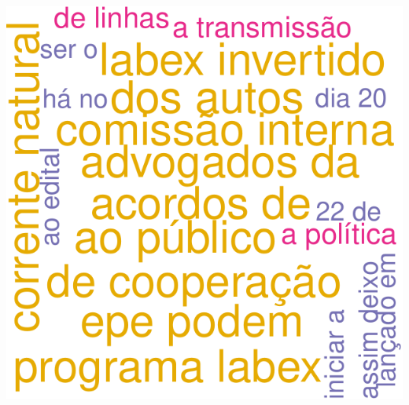 \documentclass[]{article}
\begin{document}
\includegraphics{markdown_v30_files/figure-latex/wordcloud_onegram_DIR05_semstopwords-1.pdf}
\end{document}
